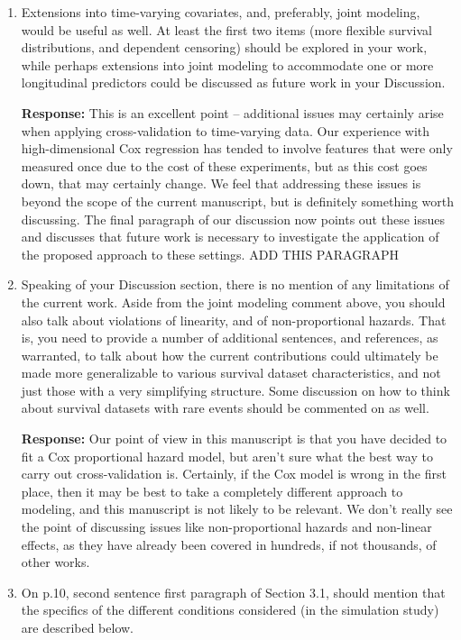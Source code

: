 \documentclass[12]{article}
\newcommand{\re}{\textbf{Response: }}
\newcommand\pb[1]{{\color{red}#1}}
\begin{document}
\begin{enumerate}[align = left]
\item Extensions into time-varying covariates, and, preferably, joint modeling, would be useful as well. At least the first two items (more flexible survival distributions, and dependent censoring) should be explored in your work, while perhaps extensions into joint modeling to accommodate one or more longitudinal predictors could be discussed as future work in your Discussion.
        
\re This is an excellent point -- additional issues may certainly arise when applying cross-validation to time-varying data. Our experience with high-dimensional Cox regression has tended to involve features that were only measured once due to the cost of these experiments, but as this cost goes down, that may certainly change. We feel that addressing these issues is beyond the scope of the current manuscript, but is definitely something worth discussing. The final paragraph of our discussion now points out these issues and discusses that future work is necessary to investigate the application of the proposed approach to these settings. \pb{ADD THIS PARAGRAPH}

\item \label{limitations} Speaking of your Discussion section, there is no mention of any limitations of the current work. Aside from the joint modeling comment above, you should also talk about violations of linearity, and of non-proportional hazards. That is, you need to provide a number of additional sentences, and references, as warranted, to talk about how the current contributions could ultimately be made more generalizable to various survival dataset characteristics, and not just those with a very simplifying structure. Some discussion on how to think about survival datasets with rare events should be commented on as well.

  \re Our point of view in this manuscript is that you have decided to fit a Cox proportional hazard model, but aren't sure what the best way to carry out cross-validation is. Certainly, if the Cox model is wrong in the first place, then it may be best to take a completely different approach to modeling, and this manuscript is not likely to be relevant. We don't really see the point of discussing issues like non-proportional hazards and non-linear effects, as they have already been covered in hundreds, if not thousands, of other works.

\item On p.10, second sentence first paragraph of Section 3.1, should mention that the specifics of the different conditions considered (in the simulation study) are described below.


\end{enumerate}
\end{document}
